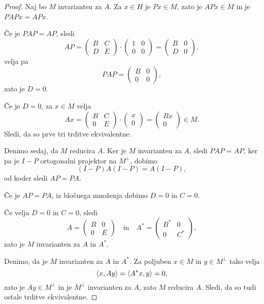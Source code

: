 \begin{proof}
Naj bo $M$ invarianten za $A$. Za $x \in H$ je $Px \in M$, zato je
$APx \in M$ in je $PAPx = APx$.

Če je $PAP = AP$, sledi
\[
AP =
\begin{pmatrix}
B & C \\
D & E
\end{pmatrix}
\cdot
\begin{pmatrix}
1 & 0 \\
0 & 0
\end{pmatrix}
=
\begin{pmatrix}
B & 0 \\
D & 0
\end{pmatrix},
\]
velja pa
\[
PAP =
\begin{pmatrix}
B & 0 \\
0 & 0
\end{pmatrix},
\]
zato je $D = 0$.

Če je $D = 0$, za $x \in M$ velja
\[
Ax =
\begin{pmatrix}
B & C \\
0 & E
\end{pmatrix}
\cdot
\begin{pmatrix}
x \\
0
\end{pmatrix}
=
\begin{pmatrix}
Bx \\
0
\end{pmatrix}
\in M.
\]
Sledi, da so prve tri trditve ekvivalentne.

Denimo sedaj, da $M$ reducira $A$. Ker je $M$ invarianten za $A$,
sledi $PAP = AP$, ker pa je $I-P$ ortogonalni projektor na
$M^\bot$, dobimo
\[
(I-P)A(I-P) = A(I-P),
\]
od koder sledi $AP = PA$.

Če je $AP = PA$, iz bločnega množenja dobimo $D = 0$ in $C = 0$.

Če velja $D = 0$ in $C = 0$, sledi
\[
A =
\begin{pmatrix}
B & 0 \\
0 & E
\end{pmatrix}
\quad \text{in} \quad
A^* =
\begin{pmatrix}
B^* & 0   \\
0   & C^*
\end{pmatrix},
\]
zato je $M$  invarianten za $A$ in $A^*$.

Denimo, da je $M$ invarianten za $A$ in $A^*$. Za poljuben
$x \in M$ in $y \in M^\bot$ tako velja
\[
\left\langle x, Ay\right\rangle = \left\langle A^*x, y\right\rangle = 0,
\]
zato je $Ay \in M^\bot$ in je $M^\bot$ invarianten za $A$, zato $M$
reducira $A$. Sledi, da so tudi ostale trditve ekvivalentne.
\end{proof}

